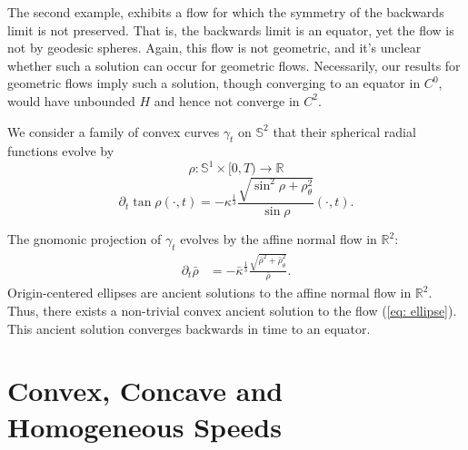 \documentclass{amsart}
\begin{document}
The second example, exhibits a flow for which the symmetry of the backwards limit is not preserved. That is, the backwards limit is an equator, yet the flow is not by geodesic spheres. Again, this flow is not geometric, and it's unclear whether such a solution can occur for geometric flows. Necessarily, our results for geometric flows imply such a solution, though converging to an equator in \(C^0\), would have unbounded \(H\) and hence not converge in \(C^2\).

\begin{example}
We consider a family of convex curves $\gamma_t$ on $\mathbb{S}^2$ that their spherical radial functions evolve by
\[\rho:\mathbb{S}^1\times[0,T)\to \mathbb{R}\]
\begin{equation}\label{eq: ellipse}
\partial_t\tan\rho(\cdot,t)=-\kappa^{\frac{1}{3}} \frac{\sqrt{\sin^2\rho+\rho_{\theta}^2}}{\sin\rho}(\cdot,t).
\end{equation}

The gnomonic projection of $\gamma_t$ evolves by the affine normal flow in $\mathbb{R}^2:$ 
\begin{align*}
\partial_t\bar{\rho}&=-\bar{\kappa}^{\frac{1}{3}}\frac{\sqrt{\bar{\rho}^2+\bar{\rho}_{\theta}^2}}{\bar{\rho}}.
\end{align*}
Origin-centered ellipses are ancient solutions \cite{ivaki} to the affine normal flow in $\mathbb{R}^2$. Thus, there exists a non-trivial convex ancient solution to the flow (\ref{eq: ellipse}). This ancient solution converges backwards in time to an equator. 
\end{example}

\section{Convex, Concave and Homogeneous Speeds}
\label{sec:convex_concave_homogeneous}
\end{document}
